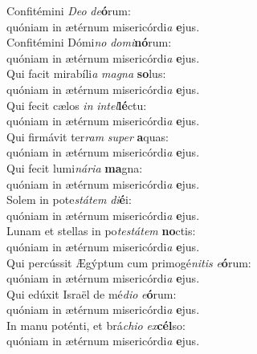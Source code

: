 \evenverse Confitémini \textit{De}\textit{o} \textit{de}\textbf{ó}rum:~\*\\
\evenverse quóniam in ætérnum misericórdi\textit{a} \textbf{e}jus.\\
\oddverse Confitémini Dómi\textit{no} \textit{do}\textit{mi}\textbf{nó}rum:~\*\\
\oddverse quóniam in ætérnum misericórdi\textit{a} \textbf{e}jus.\\
\evenverse Qui facit mirabíli\textit{a} \textit{ma}\textit{gna} \textbf{so}lus:~\*\\
\evenverse quóniam in ætérnum misericórdi\textit{a} \textbf{e}jus.\\
\oddverse Qui fecit cælos \textit{in} \textit{in}\textit{tel}\textbf{lé}ctu:~\*\\
\oddverse quóniam in ætérnum misericórdi\textit{a} \textbf{e}jus.\\
\evenverse Qui firmávit ter\textit{ram} \textit{su}\textit{per} \textbf{a}quas:~\*\\
\evenverse quóniam in ætérnum misericórdi\textit{a} \textbf{e}jus.\\
\oddverse Qui fecit lumi\textit{ná}\textit{ri}\textit{a} \textbf{ma}gna:~\*\\
\oddverse quóniam in ætérnum misericórdi\textit{a} \textbf{e}jus.\\
\evenverse Solem in pote\textit{stá}\textit{tem} \textit{di}\textbf{é}i:~\*\\
\evenverse quóniam in ætérnum misericórdi\textit{a} \textbf{e}jus.\\
\oddverse Lunam et stellas in po\textit{te}\textit{stá}\textit{tem} \textbf{no}ctis:~\*\\
\oddverse quóniam in ætérnum misericórdi\textit{a} \textbf{e}jus.\\
\evenverse Qui percússit Ægýptum cum primogé\textit{ni}\textit{tis} \textit{e}\textbf{ó}rum:~\*\\
\evenverse quóniam in ætérnum misericórdi\textit{a} \textbf{e}jus.\\
\oddverse Qui edúxit Israël de mé\textit{di}\textit{o} \textit{e}\textbf{ó}rum:~\*\\
\oddverse quóniam in ætérnum misericórdi\textit{a} \textbf{e}jus.\\
\evenverse In manu poténti, et brá\textit{chi}\textit{o} \textit{ex}\textbf{cél}so:~\*\\
\evenverse quóniam in ætérnum misericórdi\textit{a} \textbf{e}jus.\\
